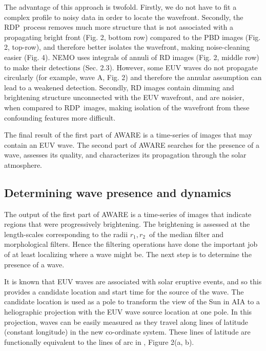 \documentclass[referee,a4paper,12pt,traditabstract]{swsc}
\newcommand{\RDP}{RDP}
\begin{document}
\begin{linenumbers}
The advantage of this approach is twofold. Firstly, we do not have to
fit a complex profile to noisy data in order to locate the
wavefront. Secondly, the \RDP\ process removes much more structure
that is not associated with a propagating bright front (Fig. 2, bottom
row) compared to the PBD images (Fig. 2, top-row), and therefore
better isolates the wavefront, making noise-cleaning easier (Fig. 4).
NEMO \citep{2005SoPh..228..265P} uses integrals of annuli of RD images
(Fig. 2, middle row) to make their detections (Sec. 2.3). However,
some EUV waves do not propagate circularly (for example, wave A,
Fig. 2) and therefore the annular assumption can lead to a weakened
detection.  Secondly, RD images contain dimming and brightening
structure unconnected with the EUV wavefront, and are noisier, when
compared to \RDP\ images, making isolation of the wavefront from these
confounding features more difficult.

The final result of the first part of AWARE is a time-series of images
that may contain an EUV wave.  The second part of AWARE searches for
the presence of a wave, assesses its quality, and characterizes its
propagation through the solar atmosphere.

\subsection{Determining wave presence and
  dynamics}\label{sec:aware:dynamics}

The output of the first part of AWARE is a time-series of images that
indicate regions that were progressively brightening.  The brightening
is assessed at the length-scales corresponding to the radii $r_{1},
r_{2}$\textellipsis\ of the median filter and morphological filters.
Hence the filtering operations have done the important job of at least
localizing where a wave might be.  The next step is to determine the
presence of a wave.

It is known that EUV waves are associated with solar eruptive events,
and so this provides a candidate location and start time for the
source of the wave. The candidate location is used as a pole to
transform the view of the Sun in AIA to a heliographic projection with
the EUV wave source location at one pole.  In this projection, waves
can be easily measured as they travel along lines of latitude
(constant longitude) in the new co-ordinate system.  These lines of
latitude are functionally equivalent to the lines of arc in
\citet{2014SoPh..289.3279L}, Figure 2(a, b).


\end{linenumbers}
\end{document}
